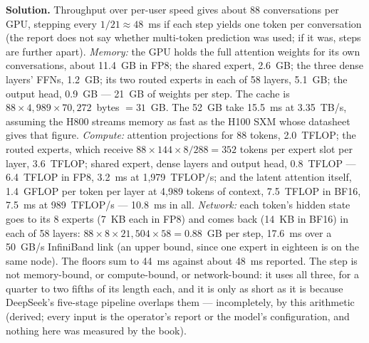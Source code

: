 \textbf{Solution.} Throughput over per-user speed gives about 88 conversations
per GPU, stepping every $1/21 \approx 48$~ms if each step yields one token per
conversation (the report does not say whether multi-token prediction was used; if
it was, steps are further apart). \emph{Memory:} the GPU holds the full attention
weights for its own conversations, about 11.4~GB in FP8; the shared expert,
2.6~GB; the three dense layers' FFNs, 1.2~GB; its two routed experts in each of 58
layers, 5.1~GB; the output head, 0.9~GB --- 21~GB of weights per step. The cache
is $88 \times 4{,}989 \times 70{,}272$~bytes $= 31$~GB. The 52~GB take 15.5~ms at
3.35~TB/s, assuming the H800 streams memory as fast as the H100 SXM whose
datasheet gives that figure. \emph{Compute:} attention projections for 88 tokens,
2.0~TFLOP; the routed experts, which receive $88 \times 144 \times 8 / 288 = 352$
tokens per expert slot per layer, 3.6~TFLOP; shared expert, dense layers and output
head, 0.8~TFLOP --- 6.4~TFLOP in FP8, 3.2~ms at 1,979~TFLOP/s; and the latent
attention itself, 1.4~GFLOP per token per layer at 4,989 tokens of context,
7.5~TFLOP in BF16, 7.5~ms at 989~TFLOP/s --- 10.8~ms in all. \emph{Network:} each
token's hidden state goes to its 8 experts (7~KB each in FP8) and comes back
(14~KB in BF16) in each of 58 layers: $88 \times 8 \times 21{,}504 \times 58 =
0.88$~GB per step, 17.6~ms over a 50~GB/s InfiniBand link \cite{deepseek2024v3}
(an upper bound, since one expert in eighteen is on the same node). The floors
sum to 44~ms against about 48~ms reported. The step is not memory-bound, or
compute-bound, or network-bound: it uses all three, for a quarter to two fifths
of its length each, and it is only as short as it is because DeepSeek's five-stage
pipeline overlaps them --- incompletely, by this arithmetic (derived; every
input is the operator's report or the model's configuration, and nothing here
was measured by the book).
